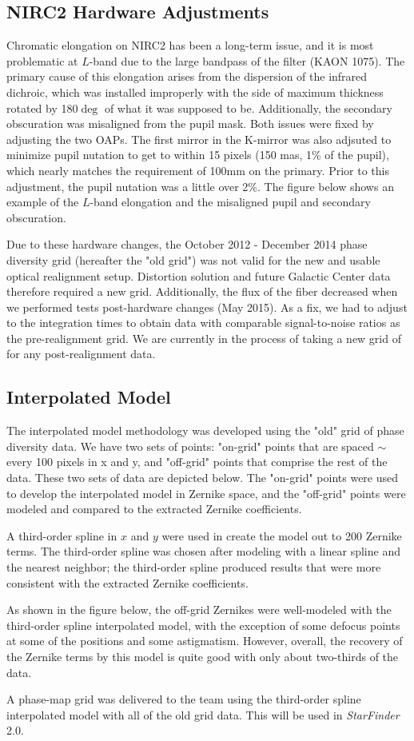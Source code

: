 \subsection{NIRC2 Hardware Adjustments}
Chromatic elongation on NIRC2 has been a long-term issue, and it is most problematic at $L$-band due to the large bandpass of the filter (KAON 1075). The primary cause of this elongation arises from the dispersion of the infrared dichroic, which was installed improperly with the side of maximum thickness rotated by 180$\deg$ of what it was supposed to be. Additionally, the secondary obscuration was misaligned from the pupil mask. Both issues were fixed by adjusting the two OAPs. The first mirror in the K-mirror was also adjsuted to minimize pupil nutation to get to within 15 pixels (150 mas, 1\% of the pupil), which nearly matches the requirement of 100mm on the primary. Prior to this adjustment, the pupil nutation was a little over 2\%. The figure below shows an example of the $L$-band elongation and the misaligned pupil and secondary obscuration.

Due to these hardware changes, the October 2012 - December 2014 phase diversity grid (hereafter the "old grid") was not valid for the new and usable optical realignment setup. Distortion solution and future Galactic Center data therefore required a new grid. Additionally, the flux of the fiber decreased when we performed tests post-hardware changes (May 2015). As a fix, we had to adjust to the integration times to obtain data with comparable signal-to-noise ratios as the pre-realignment grid. We are currently in the process of taking a new grid of for any post-realignment data.
\subsection{Interpolated Model}
The interpolated model methodology was developed using the "old" grid of phase diversity data. We have two sets of points: "on-grid" points that are spaced $\sim$every 100 pixels in x and y, and "off-grid" points that comprise the rest of the data. These two sets of data are depicted below. The "on-grid" points were used to develop the interpolated model in Zernike space, and the "off-grid" points were modeled and compared to the extracted Zernike coefficients.

A third-order spline in $x$ and $y$ were used in create the model out to 200 Zernike terms. The third-order spline was chosen after modeling with a linear spline and the nearest neighbor; the third-order spline produced results that were more consistent with the extracted Zernike coefficients. 

As shown in the figure below, the off-grid Zernikes were well-modeled with the third-order spline interpolated model, with the exception of some defocus points at some of the positions and some astigmatism. However, overall, the recovery of the Zernike terms by this model is quite good with only about two-thirds of the data. 

A phase-map grid was delivered to the team using the third-order spline interpolated model with all of the old grid data. This will be used in \textit{StarFinder} 2.0.
    
    
    
  